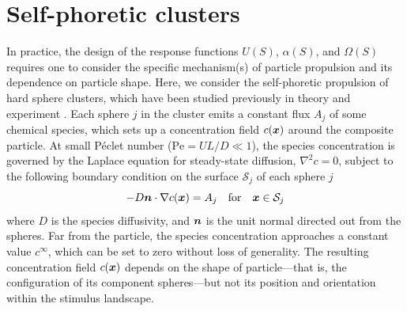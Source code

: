 \section{Self-phoretic clusters}  
In practice, the design of the response functions $U(S)$, $\alpha(S)$, and $\Omega(S)$ requires one to consider the specific mechanism(s) of particle propulsion and its dependence on particle shape. Here, we consider the self-phoretic propulsion of hard sphere clusters, which have been studied previously in theory \autocite{soto2014self, varma2018clustering} and experiment \autocite{niu2018dynamics, schmidt2019light}. Each sphere $j$ in the cluster emits a constant flux $A_j$ of some chemical species, which sets up a concentration field $c(\boldsymbol{x})$ around the composite particle. At small P\'eclet number ($\text{Pe}=UL/D\ll1$), the species concentration is governed by the Laplace equation for steady-state diffusion, $\nabla^2c=0$, subject to the following boundary condition on the surface $\mathcal{S}_j$ of each sphere $j$
\begin{equation}
   -D\boldsymbol{n} \cdot \nabla c(\boldsymbol{x}) = A_j \quad \text{for} \quad \boldsymbol{x}\in \mathcal{S}_j
\end{equation}
where $D$ is the species diffusivity, and $\boldsymbol{n}$ is the unit normal directed out from the spheres.  Far from the particle, the species concentration approaches a constant value $c^{\infty}$, which can be set to zero without loss of generality. The resulting concentration field $c(\boldsymbol{x})$ depends on the shape of particle---that is, the configuration of its component spheres---but not its position and orientation within the stimulus landscape.

